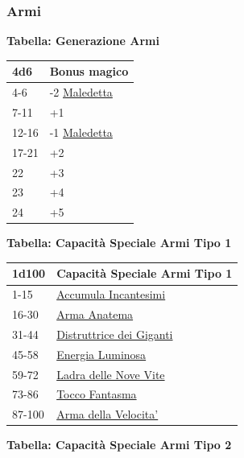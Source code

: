 \begin{multicols}{2}
{\subsubsection{Armi}

\textbf{Tabella: Generazione Armi}\hypertarget{armimagiche}{}\label{armimagiche}

\medskip

{\small\begin{tabularx}{0.45\textwidth}{lX}
		\toprule
\textbf{4d6} & \textbf{Bonus magico}\\
\toprule
4-6 & -2 \hyperlink{Arma maledetta}{Maledetta}\\
7-11 &+1\\
12-16 & -1 \hyperlink{Arma maledetta}{Maledetta}\\
17-21 & +2\\
22 & +3\\
23 & +4\\
24 &+5\\
\end{tabularx}}

\textbf{Tabella: Capacità Speciale Armi Tipo 1}\hypertarget{Capacità Speciale Armi Tipo 1}{}

\medskip

{\small \begin{tabular}{ll}
		\toprule
\textbf{1d100} & \textbf{Capacità Speciale Armi Tipo 1}\\
\toprule
1-15 &\hyperlink{Accumula Incantesimi}{Accumula Incantesimi}\\
16-30 &\hyperlink{Arma Anatema}{Arma Anatema}\\
31-44 & \hyperlink{Distruttrice dei Giganti}{Distruttrice dei Giganti}\\
45-58 & \hyperlink{Energia Luminosa}{Energia Luminosa}\\
59-72 & \hyperlink{Ladra delle NoveVite}{Ladra delle Nove Vite}\\
73-86 & \hyperlink{Tocco Fantasma}{Tocco Fantasma}\\
87-100 & \hyperlink{Arma della Velocita'}{Arma della Velocita'}\\
\end{tabular}
}
\medskip


\textbf{Tabella: Capacità Speciale Armi Tipo 2}\hypertarget{Capacità Speciale Armi Tipo 2}{}

}
\end{multicols}
